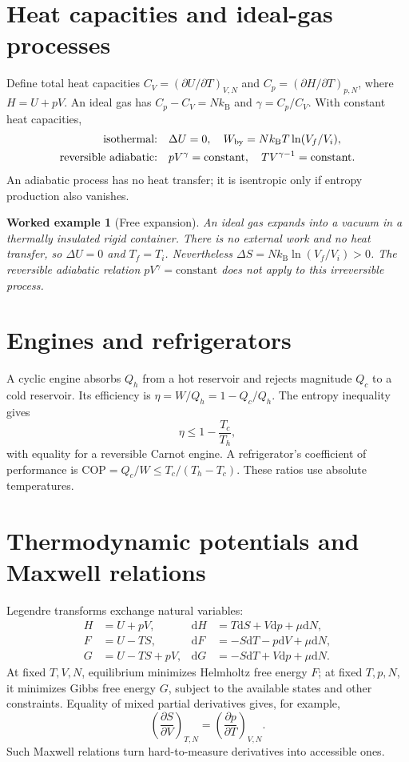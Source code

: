 \documentclass[11pt,oneside]{book}
\newcommand{\dd}{\mathrm{d}}
\newcommand{\pd}[2]{\frac{\partial #1}{\partial #2}}
\newcommand{\kb}{k_{\mathrm B}}
\theoremstyle{reviewstyle}
\newtheorem{example}{Worked example}[chapter]
\begin{document}
\section{Heat capacities and ideal-gas processes}
Define total heat capacities $C_V=(\partial U/\partial T)_{V,N}$ and $C_p=(\partial H/\partial T)_{p,N}$, where $H=U+pV$. An ideal gas has $C_p-C_V=N\kb$ and $\gamma=C_p/C_V$. With constant heat capacities,
\begin{align}
\text{isothermal:}\quad &\Delta U=0,\quad W_{\rm by}=N\kb T\ln(V_f/V_i),\\
\text{reversible adiabatic:}\quad &pV^\gamma=\text{constant},\quad TV^{\gamma-1}=\text{constant}.
\end{align}
An adiabatic process has no heat transfer; it is isentropic only if entropy production also vanishes.
\begin{example}[Free expansion]
An ideal gas expands into a vacuum in a thermally insulated rigid container. There is no external work and no heat transfer, so $\Delta U=0$ and $T_f=T_i$. Nevertheless $\Delta S=N\kb\ln(V_f/V_i)>0$. The reversible adiabatic relation $pV^\gamma=\text{constant}$ does not apply to this irreversible process.
\end{example}
\section{Engines and refrigerators}
A cyclic engine absorbs $Q_h$ from a hot reservoir and rejects magnitude $Q_c$ to a cold reservoir. Its efficiency is $\eta=W/Q_h=1-Q_c/Q_h$. The entropy inequality gives
\begin{equation}\eta\leq1-\frac{T_c}{T_h},\end{equation}
with equality for a reversible Carnot engine. A refrigerator's coefficient of performance is $\mathrm{COP}=Q_c/W\leq T_c/(T_h-T_c)$. These ratios use absolute temperatures.
\section{Thermodynamic potentials and Maxwell relations}
Legendre transforms exchange natural variables:
\begin{align}
H&=U+pV,&\dd H&=T\dd S+V\dd p+\mu\dd N,\\
F&=U-TS,&\dd F&=-S\dd T-p\dd V+\mu\dd N,\\
G&=U-TS+pV,&\dd G&=-S\dd T+V\dd p+\mu\dd N.
\end{align}
At fixed $T,V,N$, equilibrium minimizes Helmholtz free energy $F$; at fixed $T,p,N$, it minimizes Gibbs free energy $G$, subject to the available states and other constraints. Equality of mixed partial derivatives gives, for example,
\begin{equation}\left(\pd{S}{V}\right)_{T,N}=\left(\pd{p}{T}\right)_{V,N}.\end{equation}
Such Maxwell relations turn hard-to-measure derivatives into accessible ones.
\end{document}
